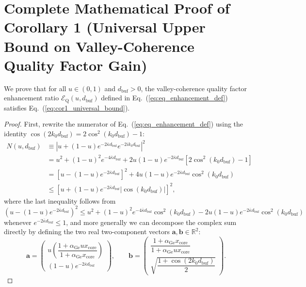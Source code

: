 \documentclass[11pt,letterpaper]{article}
\theoremstyle{definition}
\begin{document}
\section{Complete Mathematical Proof of Corollary 1 (Universal Upper Bound on Valley-Coherence Quality Factor Gain)}
\label{app:proof_cor1}

We prove that for all $u \in (0,1)$ and $d_{\mathrm{buf}} > 0$, the valley-coherence quality factor enhancement ratio $\mathcal{E}_{\mathrm{Q}}(u, d_{\mathrm{buf}})$ defined in Eq.~(\ref{eq:eq_enhancement_def}) satisfies Eq.~(\ref{eq:cor1_universal_bound}).

\begin{proof}
First, rewrite the numerator of Eq.~(\ref{eq:eq_enhancement_def}) using the identity $\cos(2k_0 d_{\mathrm{buf}}) = 2\cos^2(k_0 d_{\mathrm{buf}}) - 1$:
\begin{align}
  N(u, d_{\mathrm{buf}}) &\equiv \left| u + (1 - u) e^{-2\bar{\kappa} d_{\mathrm{buf}}} e^{-2i k_0 d_{\mathrm{buf}}} \right|^2 \nonumber \\
  &= u^2 + (1 - u)^2 e^{-4\bar{\kappa} d_{\mathrm{buf}}} + 2u(1 - u) e^{-2\bar{\kappa} d_{\mathrm{buf}}} \left[ 2\cos^2(k_0 d_{\mathrm{buf}}) - 1 \right] \nonumber \\
  &= \left[ u - (1 - u) e^{-2\bar{\kappa} d_{\mathrm{buf}}} \right]^2 + 4u(1 - u) e^{-2\bar{\kappa} d_{\mathrm{buf}}} \cos^2(k_0 d_{\mathrm{buf}}) \nonumber \\
  &\le \left[ u + (1 - u) e^{-2\bar{\kappa} d_{\mathrm{buf}}} |\cos(k_0 d_{\mathrm{buf}})| \right]^2,
  \label{eq:appB_numerator_bound}
\end{align}
where the last inequality follows from $(u - (1-u)e^{-2\bar{\kappa} d_{\mathrm{buf}}})^2 \le u^2 + (1-u)^2 e^{-4\bar{\kappa} d_{\mathrm{buf}}} \cos^2(k_0 d_{\mathrm{buf}}) - 2u(1-u)e^{-2\bar{\kappa} d_{\mathrm{buf}}}\cos^2(k_0 d_{\mathrm{buf}})$ whenever $e^{-2\bar{\kappa} d_{\mathrm{buf}}} \le 1$, and more generally we can decompose the complex sum directly by defining the two real two-component vectors $\mathbf{a}, \mathbf{b} \in \mathbb{R}^2$:
\begin{equation}
  \mathbf{a} = \begin{pmatrix} u \left(\dfrac{1 + \alpha_{\mathrm{Ge}} u x_{\mathrm{core}}}{1 + \alpha_{\mathrm{Ge}} x_{\mathrm{core}}}\right) \\[10pt] (1 - u) e^{-2\bar{\kappa} d_{\mathrm{buf}}} \end{pmatrix}, \qquad
  \mathbf{b} = \begin{pmatrix} \dfrac{1 + \alpha_{\mathrm{Ge}} x_{\mathrm{core}}}{1 + \alpha_{\mathrm{Ge}} u x_{\mathrm{core}}} \\[10pt] \sqrt{\dfrac{1 + \cos(2k_0 d_{\mathrm{buf}})}{2}} \end{pmatrix}.

\end{equation}
\end{proof}
\end{document}
